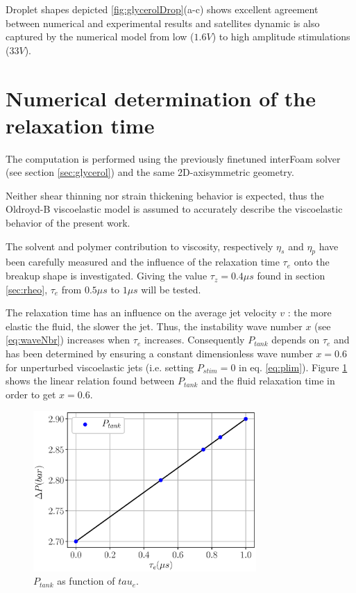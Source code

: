 \documentclass[twocolumn,10pt]{asme2ej}
\begin{document}
Droplet shapes depicted \ref{fig:glycerolDrop}(a-c) shows excellent agreement between numerical and experimental results and satellites dynamic is also captured by the numerical model from low ($1.6V$) to high amplitude stimulations ($33V$).


\section{Numerical determination of the relaxation time} \label{numericalDetermination}
The computation is performed using the previously finetuned interFoam solver (see section \ref{sec:glycerol}) and the same 2D-axisymmetric geometry. 

Neither shear thinning nor strain thickening behavior is expected, thus the Oldroyd-B viscoelastic model \cite{oldroyd1950formulation} is assumed to accurately describe the viscoelastic behavior of the present work. 

The solvent and polymer contribution to viscosity, respectively $\eta_s$ and $\eta_p$ have been carefully measured and the influence of the relaxation time $\tau_e$ onto the breakup shape is investigated. Giving the value $\tau_z= 0.4 \mu s$ found in section  \ref{sec:rheo}, $\tau_e$ from $0.5 \mu s$ to $1 \mu s$ will be tested. 

The relaxation time has an influence on the average jet velocity $v$ : the more elastic the fluid, the slower the jet. Thus, the instability wave number $x$ (see \ref{eq:waveNbr}) increases when $\tau_e$ increases. Consequently $P_{tank}$ depends on $\tau_e$ and has been determined by ensuring a constant dimensionless wave number $x=0.6$ for unperturbed viscoelastic jets (i.e. setting $P_{stim}=0$ in eq. \ref{eq:plim}). Figure \ref{fig:dP} shows the linear relation found between $P_{tank}$ and the fluid relaxation time in order to get $x=0.6$.

\begin{figure}[H]
    \centering
    \includegraphics[width=8.5cm]{dP.eps}
    \caption{$P_{tank}$ as function of $tau_e$.}
    \label{fig:dP}
\end{figure}
\end{document}
